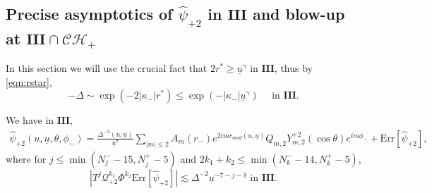 \documentclass[reqno]{amsart}
\numberwithin{equation}{section}
\newcommand{\mcq}{\mathcal{Q}}
\newcommand{\ubar}{{\underline{u}}}
\newcommand{\carterp}{\mcq_{+2}}
\newcommand{\ch}{\mathcal{CH_+}}
\newcommand{\psihat}{\widehat{\psi}}
\newcommand{\trois}{\mathbf{III}}
\newcommand{\psihatp}{\psihat_{+2}}
\newcommand{\sfrak}{2}
\theoremstyle{plain}
\theoremstyle{definition}
\theoremstyle{remark}
\numberwithin{equation}{section}
\begin{document}
\subsection{Precise asymptotics of $\psihatp$ in $\trois$ and blow-up at $\trois\cap\ch$}
In this section we will use the crucial fact that $2r^*\geq\ubar^\gamma$ in $\trois$, thus by \eqref{eqn:rstar},
$$-\Delta\sim\exp\left(-2|\kappa_-|r^*\right)\leq\exp(-|\kappa_-|\ubar^\gamma)\quad\text{ in }\trois.$$
\begin{thm}\label{thm:psip}
    We have in $\trois$,
    \begin{align*}
    \psihatp(u,\ubar,\theta,\phi_{-})=\frac{\Delta^{-2}(u,\ubar)}{\ubar^7}\sum_{|m|\leq2}A_m(r_-)e^{2imr_{mod}(u,\ubar)}Q_{m,\sfrak}Y_{m,\sfrak}^{+\sfrak}(\cos\theta)e^{im\phi_{-}}
    +\mathrm{Err}[\psihatp],
\end{align*}
where for $j\leq \min(N_j^--15,N_j^+-5)$ and $2k_1+k_2\leq \min(N_k^--14,N_k^+-5)$,
$$|T^j\carterp^{k_1}\Phi^{k_2}\mathrm{Err}[\psihatp]|\lesssim\Delta^{-2}\ubar^{-7-j-\delta}\text{   in   }\trois.$$
\end{thm}
\end{document}
